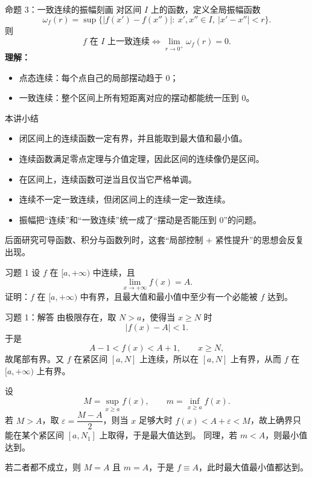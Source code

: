 ﻿\documentclass[aspectratio=169,11pt]{ctexbeamer}
\newcommand{\osc}{\omega}
\begin{document}
\begin{frame}{命题 3：一致连续的振幅刻画}
对区间 $I$ 上的函数，定义全局振幅函数
\[
  \osc_f(r)=
  \sup\bigl\{|f(x')-f(x'')|:\ x',x''\in I,\ |x'-x''|<r\bigr\}.
\]
则
\[
  f \text{ 在 }I\text{ 上一致连续}
  \Longleftrightarrow
  \lim_{r\to 0^+}\osc_f(r)=0.
\]
\vspace{0.6em}
\textbf{理解：}
\begin{itemize}
  \item 点态连续：每个点自己的局部摆动趋于 $0$；
  \item 一致连续：整个区间上所有短距离对应的摆动都能统一压到 $0$。
\end{itemize}
\end{frame}

\begin{frame}{本讲小结}
\begin{itemize}
  \item 闭区间上的连续函数一定有界，并且能取到最大值和最小值。
  \item 连续函数满足零点定理与介值定理，因此区间的连续像仍是区间。
  \item 在区间上，连续函数可逆当且仅当它严格单调。
  \item 连续不一定一致连续，但闭区间上的连续一定一致连续。
  \item 振幅把“连续”和“一致连续”统一成了“摆动是否能压到 $0$”的问题。
\end{itemize}
\vspace{0.6em}
后面研究可导函数、积分与函数列时，这套“局部控制 + 紧性提升”的思想会反复出现。
\end{frame}

\begin{frame}{习题 1}
设 $f$ 在 $[a,+\infty)$ 中连续，且
\[
  \lim_{x\to+\infty}f(x)=A.
\]
证明：$f$ 在 $[a,+\infty)$ 中有界，且最大值和最小值中至少有一个必能被 $f$ 达到。
\end{frame}

\begin{frame}{习题 1：解答}
由极限存在，取 $N>a$，使得当 $x\ge N$ 时
\[
  |f(x)-A|<1.
\]
于是
\[
  A-1<f(x)<A+1,\qquad x\ge N,
\]
故尾部有界。又 $f$ 在紧区间 $[a,N]$ 上连续，所以在 $[a,N]$ 上有界，从而 $f$ 在 $[a,+\infty)$ 上有界。
\vspace{0.5em}

设
\[
  M=\sup_{x\ge a}f(x),\qquad m=\inf_{x\ge a}f(x).
\]
若 $M>A$，取 $\varepsilon=\dfrac{M-A}{2}$，则当 $x$ 足够大时 $f(x)<A+\varepsilon<M$，故上确界只能在某个紧区间 $[a,N_1]$ 上取得，于是最大值达到。  
同理，若 $m<A$，则最小值达到。
\vspace{0.5em}

若二者都不成立，则 $M=A$ 且 $m=A$，于是 $f\equiv A$，此时最大值最小值都达到。
\end{frame}
\end{document}
